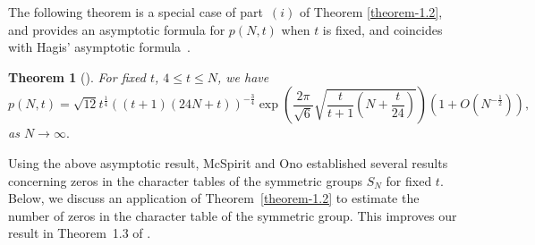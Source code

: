 \documentclass[11pt]{amsart}
\theoremstyle{plain}
\newtheorem{theorem}{Theorem}[section]
\numberwithin{equation}{section}
\begin{document}
	The following theorem is a special case of part~\hyperlink{thm1.2i}{$(i)$} of Theorem \ref{theorem-1.2}, and provides an asymptotic formula for $p(N,t)$ when $t$ is fixed, and coincides with Hagis' asymptotic formula~\cite{hagis1971partitions}.
	\begin{theorem}[{\cite[Corollary 4.2]{hagis1971partitions}}]\label{corollary-1.3}
		For fixed $t$, $4\le t \le N$, we have
		\begin{equation*}
			p(N,t)=\sqrt{12}t^{\frac{1}{4}}((t+1)(24N+t))^{-\frac{3}{4}}\exp\left(\frac{2\pi}{\sqrt{6}}\sqrt{\frac{t}{t+1}\left(N+\frac{t}{24}\right)}\right)\left(1+O\left(N^{-\frac{1}{2}}\right)\right),
		\end{equation*}
		as $N\to \infty.$
	\end{theorem}
	Using the above asymptotic result, McSpirit and Ono \cite{mcspirit2023zeros} established several results concerning zeros in the character tables of the symmetric groups $S_N$ for fixed $t$. Below, we discuss an application of Theorem~\ref{theorem-1.2} to estimate the number of zeros in the character table of the symmetric group. This improves our result in Theorem~1.3 of \cite{barman2025lower}.
\end{document}
